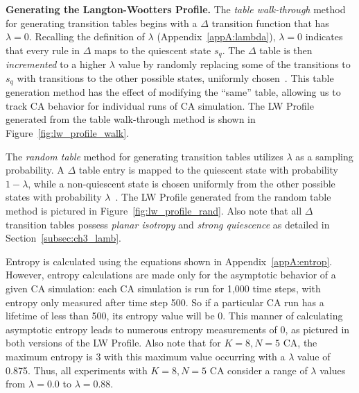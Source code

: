 \documentclass[a4paper,11pt]{article}
\begin{document}
\medskip

\noindent \textbf{Generating the Langton-Wootters Profile.} The \textit{table walk-through} method for generating transition tables begins with a $\Delta$ transition function that has $\lambda = 0$. Recalling the definition of $\lambda$ (Appendix~\ref{appA:lambda}), $\lambda=0$ indicates that every rule in $\Delta$ maps to the quiescent state $s_q$. The $\Delta$ table is then \textit{incremented} to a higher $\lambda$ value by randomly replacing some of the transitions to $s_q$ with transitions to the other possible states, uniformly chosen~\cite{la90}. This table generation method has the effect of modifying the ``same'' table, allowing us to track CA behavior for individual runs of CA simulation. The LW Profile generated from the table walk-through method is shown in Figure~\ref{fig:lw_profile_walk}.

The \textit{random table} method for generating transition tables utilizes $\lambda$ as a sampling probability. A $\Delta$ table entry is mapped to the quiescent state with probability $1 - \lambda$, while a non-quiescent state is chosen uniformly from the other possible states with probability $\lambda$~\cite{la90}. The LW Profile generated from the random table method is pictured in Figure~\ref{fig:lw_profile_rand}. Also note that all $\Delta$ transition tables possess \textit{planar isotropy} and \textit{strong quiescence} as detailed in Section~\ref{subsec:ch3_lamb}.

Entropy is calculated using the equations shown in Appendix~\ref{appA:entrop}. However, entropy calculations are made only for the asymptotic behavior of a given CA simulation: each CA simulation is run for 1,000 time steps, with entropy only measured after time step 500. So if a particular CA run has a lifetime of less than 500, its entropy value will be 0. This manner of calculating asymptotic entropy leads to numerous entropy measurements of 0, as pictured in both versions of the LW Profile. Also note that for $K=8, N=5$ CA, the maximum entropy is 3 with this maximum value occurring with a $\lambda$ value of 0.875. Thus, all experiments with $K=8, N=5$ CA consider a range of $\lambda$ values from $\lambda = 0.0$ to $\lambda = 0.88$.
\end{document}

